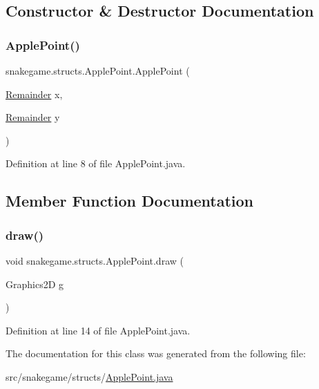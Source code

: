 \subsection{Constructor \& Destructor Documentation}
\mbox{\label{classsnakegame_1_1structs_1_1_apple_point_a4d23b0796de73346c556ee8e10bcf080}} 
\subsubsection{\texorpdfstring{Apple\+Point()}{ApplePoint()}}
{\footnotesize\ttfamily snakegame.\+structs.\+Apple\+Point.\+Apple\+Point (\begin{DoxyParamCaption}\item[{\mbox{\hyperlink{classsnakegame_1_1structs_1_1_remainder}{Remainder}}}]{x,  }\item[{\mbox{\hyperlink{classsnakegame_1_1structs_1_1_remainder}{Remainder}}}]{y }\end{DoxyParamCaption})}



Definition at line 8 of file Apple\+Point.\+java.



\subsection{Member Function Documentation}
\mbox{\label{classsnakegame_1_1structs_1_1_apple_point_a0202e1a32a56ad9778cea65a604282c6}} 
\subsubsection{\texorpdfstring{draw()}{draw()}}
{\footnotesize\ttfamily void snakegame.\+structs.\+Apple\+Point.\+draw (\begin{DoxyParamCaption}\item[{Graphics2D}]{g }\end{DoxyParamCaption})}



Definition at line 14 of file Apple\+Point.\+java.



The documentation for this class was generated from the following file\+:\begin{DoxyCompactItemize}
\item 
src/snakegame/structs/\mbox{\hyperlink{_apple_point_8java}{Apple\+Point.\+java}}\end{DoxyCompactItemize}
